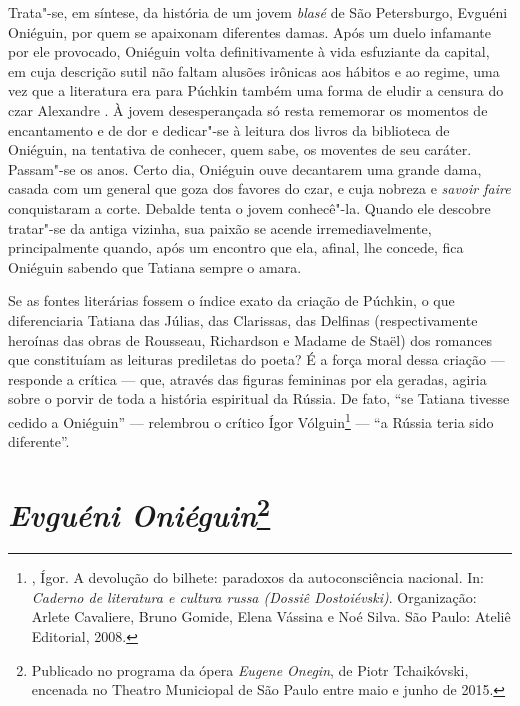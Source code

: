 Trata"-se, em síntese, da história de um jovem \emph{blasé} de São Petersburgo, Evguéni Oniéguin,
por quem se apaixonam diferentes damas. Após um duelo infamante por ele
provocado, Oniéguin volta definitivamente à vida esfuziante da capital,
em cuja descrição sutil não faltam alusões irônicas aos hábitos e ao
regime, uma vez que a literatura era para Púchkin
também uma forma de eludir a censura do czar Alexandre . À jovem
desesperançada só resta rememorar os momentos de encantamento e de dor e
dedicar"-se à leitura dos livros da biblioteca de Oniéguin, na tentativa
de conhecer, quem sabe, os moventes de seu caráter. Passam"-se os anos.
Certo dia, Oniéguin ouve decantarem uma grande dama, casada com um general
que goza dos favores do czar, e cuja nobreza e \emph{savoir faire} conquistaram
a corte. Debalde tenta o jovem conhecê"-la. Quando ele descobre tratar"-se
da antiga vizinha, sua paixão se acende irremediavelmente, principalmente
quando, após um encontro que ela, afinal, lhe concede, fica Oniéguin
sabendo que Tatiana sempre o amara.

Se as fontes literárias fossem o índice exato da criação de Púchkin, o
que diferenciaria Tatiana das Júlias, das Clarissas, das Delfinas
(respectivamente heroínas das obras de Rousseau, Richardson e Madame de
Staël) dos romances que constituíam as leituras prediletas do poeta? É a força
moral dessa criação --- responde a crítica --- que, através das figuras
femininas por ela geradas, agiria sobre o porvir de toda a história
espiritual da Rússia. De fato, ``se Tatiana tivesse cedido a Oniéguin'' ---
relembrou o crítico Ígor Vólguin\footnote{, Ígor. A devolução do bilhete: paradoxos da
autoconsciência nacional. In: \emph{Caderno de literatura e cultura russa (Dossiê Dostoiévski)}. Organização: Arlete Cavaliere, Bruno Gomide, Elena Vássina e Noé Silva. São Paulo: Ateliê Editorial, 2008.} --- ``a Rússia teria sido diferente''.

\chapter{\emph{Evguéni Oniéguin}\footnote{Publicado no programa da ópera \emph{Eugene Onegin}, de Piotr Tchaikóvski, encenada no Theatro Municiopal de São Paulo entre maio e junho de 2015.}}

